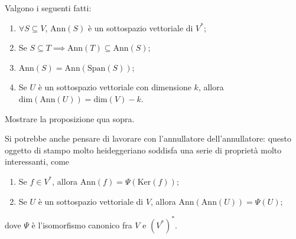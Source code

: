 Valgono i seguenti fatti:
\begin{prop} \hspace{1cm}
    \begin{enumerate}[label=\protect\circled{\arabic*}]
        \item $\forall S \subseteq V$, $\text{Ann}(S)$ è un sottospazio vettoriale di $V^\ast$;
        \item Se $S \subseteq T \implies \text{Ann}(T) \subseteq \text{Ann}(S)$;
        \item $\text{Ann}(S) = \text{Ann}(\text{Span}(S))$;
        \item Se $U$ è un sottospazio vettoriale con dimensione $k$, allora $\text{dim}(\text{Ann}(U)) = \text{dim}(V) - k$.
    \end{enumerate}
\end{prop}
\begin{exercise}
    Mostrare la proposizione qua sopra.
\end{exercise}
Si potrebbe anche pensare di lavorare con l'annullatore dell'annullatore: questo oggetto di stampo molto heideggeriano soddisfa una serie di proprietà molto interessanti, come
\begin{prop}[facoltativa] \hspace{1cm}
    \begin{enumerate}[label=\protect\circled{\arabic*}]
        \item Se $f \in V^\ast$, allora $\text{Ann}(f) = \Psi(\text{Ker}(f))$;
        \item Se $U$ è un sottospazio vettoriale di $V$, allora $\text{Ann}(\text{Ann}(U)) = \Psi(U)$;
    \end{enumerate}
    dove $\Psi$ è l'isomorfismo canonico fra $V$ e $(V^\ast)^\ast$.
\end{prop}
